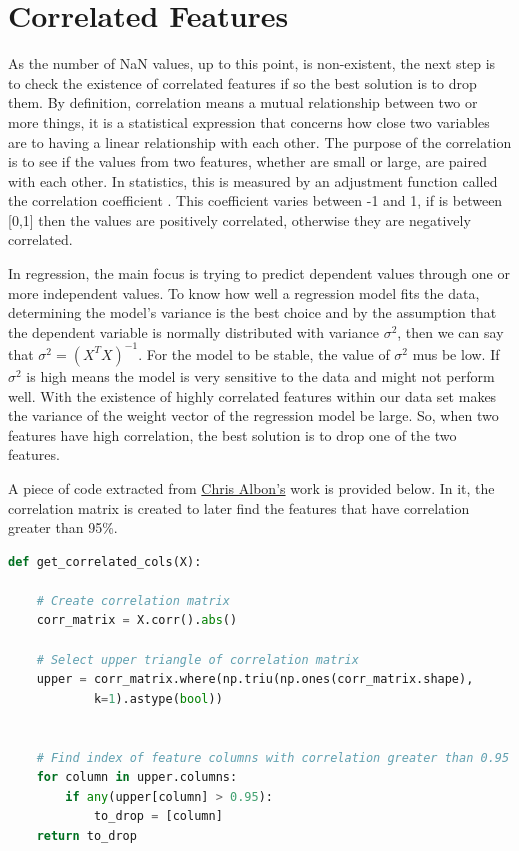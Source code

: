 \section{Correlated Features}
\label{sec:correlated_features}
\hspace{10px}As the number of NaN values, up to this point, is non-existent, the next step is to check the existence of correlated features if so the best solution is to drop them. By definition, correlation means a mutual relationship between two or more things, it is a statistical expression that concerns how close two variables are to having a linear relationship with each other\cite{Vishal}. The purpose of the correlation is to see if the values from two features, whether are small or large, are paired with each other. In statistics, this is measured by an adjustment function called the correlation coefficient \cite{corrwebsite}. This coefficient varies between -1 and 1, if is between [0,1] then the values are positively correlated, otherwise they are negatively correlated.

In regression, the main focus is trying to predict dependent values through one or more independent values. To know how well a regression model fits the data, determining the model's variance is the best choice and by the assumption that the dependent variable is normally distributed with variance \(\sigma^2\), then we can say that \(\sigma^2 = (X^TX)^{-1}\). For the model to be stable, the value of \(\sigma^2\) mus be low. If \(\sigma^2\) is high means the model is very sensitive to the data and might not perform well. With the existence of highly correlated features within our data set makes the variance of the weight vector of the regression model be large. So, when two features have high correlation, the best solution is to drop one of the two features.

A piece of code extracted from \href{https://chrisalbon.com/code/machine_learning/feature_selection/drop_highly_correlated_features/}{Chris Albon’s} work is provided below. In it, the correlation matrix is created to later find the features that have correlation greater than 95\%.

\begin{lstlisting}[language=Python]
def get_correlated_cols(X):

    # Create correlation matrix
    corr_matrix = X.corr().abs()

    # Select upper triangle of correlation matrix
    upper = corr_matrix.where(np.triu(np.ones(corr_matrix.shape),
            k=1).astype(bool))
           
           
    # Find index of feature columns with correlation greater than 0.95
    for column in upper.columns:
        if any(upper[column] > 0.95):
            to_drop = [column]
    return to_drop
\end{lstlisting}


